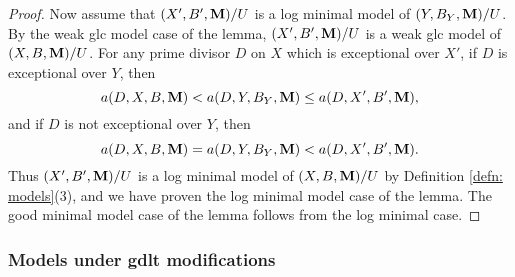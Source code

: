 \documentclass[11pt]{amsart}
\numberwithin{equation}{section}
\newcommand{\Mm}{{\bf{M}}}
\theoremstyle{definition}
\theoremstyle{definition}
\theoremstyle{definition}
\begin{document}
\begin{proof}
Now assume that $(X',B',\Mm)/U$ is a log minimal model of $(Y,B_Y,\Mm)/U$. By the  weak glc model case of the lemma, $(X',B',\Mm)/U$ is a weak glc model of $(X,B,\Mm)/U$. For any prime divisor $D$ on $X$ which is exceptional over $X'$, if $D$ is exceptional over $Y$, then $$a(D,X,B,\Mm)<a(D,Y,B_Y,\Mm)\leq a(D,X',B',\Mm),$$
and if $D$ is not exceptional over $Y$, then
$$a(D,X,B,\Mm)=a(D,Y,B_Y,\Mm)<a(D,X',B',\Mm).$$
Thus $(X',B',\Mm)/U$ is a log minimal model of $(X,B,\Mm)/U$ by Definition \ref{defn: models}(3), and we have proven the log minimal model case of the lemma. The good minimal model case of the lemma follows from the log minimal case.
\end{proof}


\subsubsection{Models under gdlt modifications}
\end{document}

